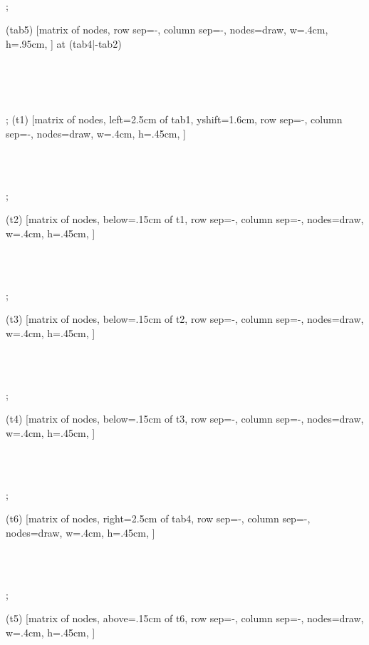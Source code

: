 \documentclass[border=1mm]{standalone}
\begin{document}
{{        {}\\ {} \\{} \\
};

\matrix (tab5) [matrix of nodes, 
row sep=-\pgflinewidth,
    column sep=-\pgflinewidth,
                 nodes={draw, w=.4cm, h=.95cm},
                 ] at (tab4|-tab2) {
        
        {}\\ {} \\{} \\
};
\matrix (t1) [matrix of nodes, left=2.5cm of tab1, yshift=1.6cm,
    row sep=-\pgflinewidth,
    column sep=-\pgflinewidth,
                 nodes={draw, w=.4cm, h=.45cm},
                 ] {
        
        {}\\ {} \\
};

\matrix (t2) [matrix of nodes, below=.15cm of t1,
    row sep=-\pgflinewidth,
    column sep=-\pgflinewidth,
                 nodes={draw, w=.4cm, h=.45cm},
                 ] {
        
        {}\\ {} \\
};

\matrix (t3) [matrix of nodes, below=.15cm of t2,
    row sep=-\pgflinewidth,
    column sep=-\pgflinewidth,
                 nodes={draw, w=.4cm, h=.45cm},
                 ] {
        
        {}\\ {} \\
};

\matrix (t4) [matrix of nodes, below=.15cm of t3,
    row sep=-\pgflinewidth,
    column sep=-\pgflinewidth,
                 nodes={draw, w=.4cm, h=.45cm},
                 ] {
        
        {}\\ {} \\
};

\matrix (t6) [matrix of nodes, right=2.5cm of tab4,
    row sep=-\pgflinewidth,
    column sep=-\pgflinewidth,
                 nodes={draw, w=.4cm, h=.45cm},
                 ] {
        
        {}\\ {} \\
};

\matrix (t5) [matrix of nodes, above=.15cm of t6,
    row sep=-\pgflinewidth,
    column sep=-\pgflinewidth,
                 nodes={draw, w=.4cm, h=.45cm},
                 ] {
        
}}
\end{document}
